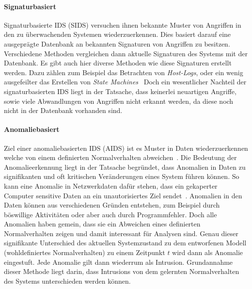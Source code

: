             \paragraph{Signaturbasiert} 
                Signaturbasierte IDS (SIDS) versuchen ihnen bekannte Muster von Angriffen 
                in den zu überwachenden Systemen wiederzuerkennen.
                Dies basiert darauf eine ausgeprägte Datenbank an bekannten Signaturen von Angriffen zu besitzen.
                Verschiedene Methoden vergleichen dann aktuelle Signaturen des Systems mit der Datenbank.
                Es gibt auch hier diverse Methoden wie diese Signaturen erstellt werden. 
                Dazu zählen zum Beispiel das Betrachten von \textit{Host-Logs},
                oder ein wenig ausgefeilter das Erstellen von \textit{State Machines}~\cite{SIDSstate}
                Doch ein wesentlicher Nachteil der signaturbasierten IDS liegt in der Tatsache,
                dass keinerlei neuartigen Angriffe, sowie viele Abwandlungen von Angriffen nicht erkannt werden,
                da diese noch nicht in der Datenbank vorhanden sind.~\cite{IDSsurvey}

            \paragraph{Anomaliebasiert}
            Ziel einer anomaliebasierten IDS (AIDS) ist es Muster in Daten wiederzuerkennen 
                welche von einem definierten Normalverhalten abweichen~\cite{ANOMALYSURVEY}.
                Die Bedeutung der Anomalieerkennung liegt in der Tatsache begründet,
                dass Anomalien in Daten zu signifikanten und oft kritischen Veränderungen eines System führen können. 
                So kann eine Anomalie in Netzwerkdaten dafür stehen,
                dass ein gekaperter Computer sensitive Daten an ein unautorisiertes Ziel sendet~\cite{ANOMALYEXAMPLE}.
                Anomalien in den Daten können aus verschiedenen Gründen entstehen,
                zum Beispiel durch böswillige Aktivitäten oder aber auch durch Programmfehler.
                Doch alle Anomalien haben gemein,
                dass sie ein Abweichen eines definierten Normalverhalten zeigen und damit interessant für Analysen sind.
                Genau dieser signifikante Unterschied des aktuellen Systemzustand zu dem entworfenen Modell
                (wohldefiniertes Normalverhalten) zu einem Zeitpunkt $t$ wird dann als Anomalie eingestuft.
                Jede Anomalie gilt dann wiederrum als Intrusion.
                Grundannahme dieser Methode liegt darin, dass Intrusions von dem gelernten Normalverhalten des Systems unterschieden werden können.

